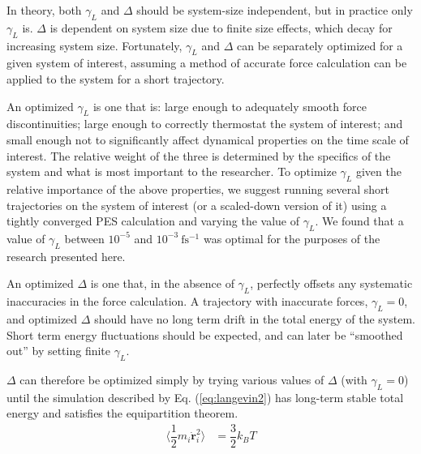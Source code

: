 \documentclass[10pt,aps,prl,twocolumn,amsmath,amssymb,superscriptaddress,longbibliography]{revtex4-1}
\begin{document}
In theory, both $\gamma_L$ and $\Delta$ should be system-size independent, but in practice only $\gamma_L$ is.
$\Delta$ is dependent on system size due to finite size effects, which decay for increasing system size.
Fortunately, $\gamma_L$ and $\Delta$ can be separately optimized for a given system of interest, assuming a method of accurate force calculation can be applied to the system for a short trajectory. 

An optimized $\gamma_L$ is one that is: large enough to adequately smooth force discontinuities; large enough to correctly thermostat the system of interest; and small enough not to significantly affect dynamical properties on the time scale of interest. 
The relative weight of the three is determined by the specifics of the system and what is most important to the researcher. 
To optimize $\gamma_L$ given the relative importance of the above properties, we suggest running several short trajectories on the system of interest (or a scaled-down version of it) using a tightly converged PES calculation and varying the value of $\gamma_L$. 
We found that a value of $\gamma_L$ between $10^{-5}$ and $10^{-3}\ \mathrm{fs^{-1}}$ was optimal for the purposes of the research presented here.

An optimized $\Delta$ is one that, in the absence of $\gamma_L$, perfectly offsets any systematic inaccuracies in the force calculation. 
A trajectory with inaccurate forces, \mbox{$\gamma_L = 0$}, and optimized $\Delta$ should have no long term drift in the total energy of the system. Short term energy fluctuations should be expected, and can later be ``smoothed out'' by setting finite $\gamma_L$.

$\Delta$ can therefore be optimized simply by trying various values of $\Delta$ (with \mbox{$\gamma_L = 0$}) until the simulation described by Eq. (\ref{eq:langevin2}) has long-term stable total energy and satisfies the equipartition theorem. 
%
\begin{align}
\label{eq:eqipartition}
\langle \dfrac{1}{2} m_i \dot{\bm{r}}^{2}_{i} \rangle &= \dfrac{3}{2} k_{B} T
\end{align}
%
\end{document}
